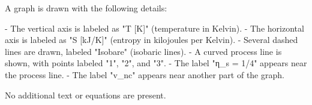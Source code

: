 A graph is drawn with the following details:  

- The vertical axis is labeled as "T [K]" (temperature in Kelvin).  
- The horizontal axis is labeled as "S [kJ/K]" (entropy in kilojoules per Kelvin).  
- Several dashed lines are drawn, labeled "Isobare" (isobaric lines).  
- A curved process line is shown, with points labeled "1", "2", and "3".  
- The label "η_s = 1/4" appears near the process line.  
- The label "v_nc" appears near another part of the graph.  

No additional text or equations are present.
